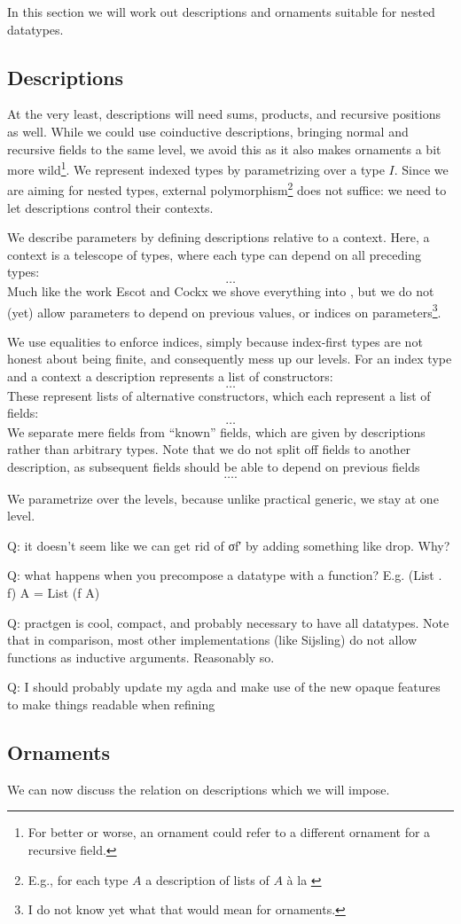 In this section we will work out descriptions and ornaments suitable for nested datatypes.

\subsection{Descriptions}
At the very least, descriptions will need sums, products, and recursive positions as well. While we could use coinductive descriptions, bringing normal and recursive fields to the same level, we avoid this as it also makes ornaments a bit more wild\footnote{For better or worse, an ornament could refer to a different ornament for a recursive field.}. We represent indexed types by parametrizing over a type $I$. Since we are aiming for nested types, external polymorphism\footnote{E.g., for each type $A$ a description of lists of $A$ à la \cite{progorn}} does not suffice: we need to let descriptions control their contexts.

We describe parameters by defining descriptions relative to a context. Here, a context is a telescope of types, where each type can depend on all preceding types:
\[ \dots \]
Much like the work Escot and Cockx \cite{practgen} we shove everything into , but we do not (yet) allow parameters to depend on previous values, or indices on parameters\footnote{I do not know yet what that would mean for ornaments.}.

We use equalities to enforce indices, simply because index-first types are not honest about being finite, and consequently mess up our levels. For an index type and a context a description represents a list of constructors:
\[ \dots \]
These represent lists of alternative constructors, which each represent a list of fields:
\[ \dots \]
We separate mere fields from ``known'' fields, which are given by descriptions rather than arbitrary types. Note that we do not split off fields to another description, as subsequent fields should be able to depend on previous fields
\[ \dots. \]


We parametrize over the levels, because unlike practical generic, we stay at one level.

Q: it doesn't seem like we can get rid of σf′ by adding something like drop. Why?

Q: what happens when you precompose a datatype with a function? E.g. (List . f) A = List (f A) 

Q: practgen is cool, compact, and probably necessary to have all datatypes. Note that in comparison, most other implementations (like Sijsling) do not allow functions as inductive arguments. Reasonably so.

Q: I should probably update my agda and make use of the new opaque features to make things readable when refining

\subsection{Ornaments}
We can now discuss the relation on descriptions which we will impose.


